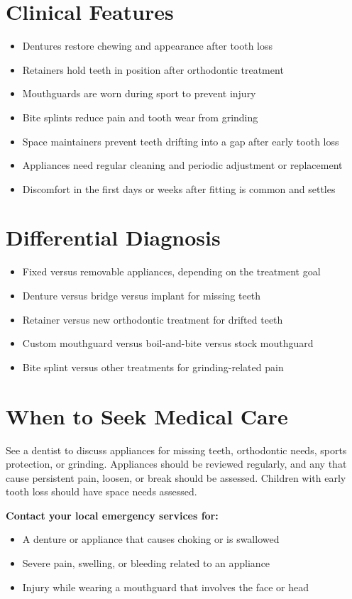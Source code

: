 \section*{Clinical Features}
\begin{itemize}
    \item Dentures restore chewing and appearance after tooth loss
    \item Retainers hold teeth in position after orthodontic treatment
    \item Mouthguards are worn during sport to prevent injury
    \item Bite splints reduce pain and tooth wear from grinding
    \item Space maintainers prevent teeth drifting into a gap after early tooth loss
    \item Appliances need regular cleaning and periodic adjustment or replacement
    \item Discomfort in the first days or weeks after fitting is common and settles
\end{itemize}

\section*{Differential Diagnosis}
\begin{itemize}
    \item Fixed versus removable appliances, depending on the treatment goal
    \item Denture versus bridge versus implant for missing teeth
    \item Retainer versus new orthodontic treatment for drifted teeth
    \item Custom mouthguard versus boil-and-bite versus stock mouthguard
    \item Bite splint versus other treatments for grinding-related pain
\end{itemize}

\section*{When to Seek Medical Care}
See a dentist to discuss appliances for missing teeth, orthodontic needs, sports protection, or grinding. Appliances should be reviewed regularly, and any that cause persistent pain, loosen, or break should be assessed. Children with early tooth loss should have space needs assessed.

\textbf{Contact your local emergency services for:}
\begin{itemize}
    \item A denture or appliance that causes choking or is swallowed
    \item Severe pain, swelling, or bleeding related to an appliance
    \item Injury while wearing a mouthguard that involves the face or head
\end{itemize}

